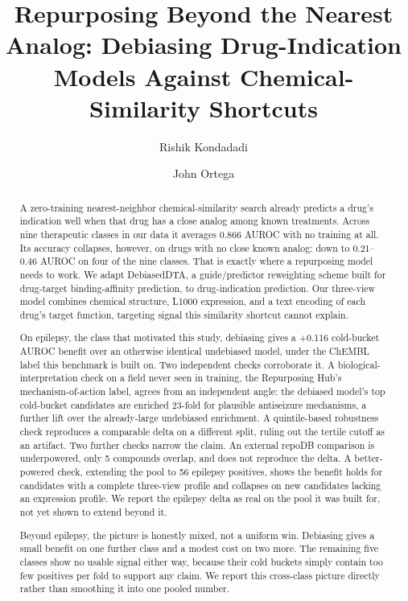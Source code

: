 \documentclass{llncs}
\begin{document}
\title{Repurposing Beyond the Nearest Analog: Debiasing Drug-Indication Models Against Chemical-Similarity Shortcuts}

\author{Rishik Kondadadi \and John Ortega}

\maketitle

\begin{abstract}
A zero-training nearest-neighbor chemical-similarity search already predicts a drug's indication well when that drug has a close analog among known treatments. Across nine therapeutic classes in our data it averages 0.866 AUROC with no training at all. Its accuracy collapses, however, on drugs with no close known analog: down to 0.21--0.46 AUROC on four of the nine classes. That is exactly where a repurposing model needs to work. We adapt DebiasedDTA, a guide/predictor reweighting scheme built for drug-target binding-affinity prediction, to drug-indication prediction. Our three-view model combines chemical structure, L1000 expression, and a text encoding of each drug's target function, targeting signal this similarity shortcut cannot explain.

On epilepsy, the class that motivated this study, debiasing gives a +0.116 cold-bucket AUROC benefit over an otherwise identical undebiased model, under the ChEMBL label this benchmark is built on. Two independent checks corroborate it. A biological-interpretation check on a field never seen in training, the Repurposing Hub's mechanism-of-action label, agrees from an independent angle: the debiased model's top cold-bucket candidates are enriched 23-fold for plausible antiseizure mechanisms, a further lift over the already-large undebiased enrichment. A quintile-based robustness check reproduces a comparable delta on a different split, ruling out the tertile cutoff as an artifact. Two further checks narrow the claim. An external repoDB comparison is underpowered, only 5 compounds overlap, and does not reproduce the delta. A better-powered check, extending the pool to 56 epilepsy positives, shows the benefit holds for candidates with a complete three-view profile and collapses on new candidates lacking an expression profile. We report the epilepsy delta as real on the pool it was built for, not yet shown to extend beyond it.

Beyond epilepsy, the picture is honestly mixed, not a uniform win. Debiasing gives a small benefit on one further class and a modest cost on two more. The remaining five classes show no usable signal either way, because their cold buckets simply contain too few positives per fold to support any claim. We report this cross-class picture directly rather than smoothing it into one pooled number.


\end{abstract}
\end{document}
